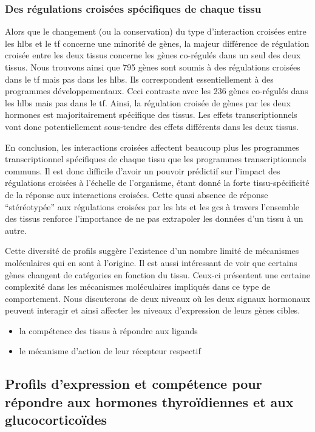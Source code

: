 \documentclass[../main.tex]{subfiles}
\begin{document}
		\subsubsection{Des régulations croisées spécifiques de chaque tissu}
			Alors que le changement (ou la conservation) du type d'interaction croisées entre les \glspl{hlb} et le \gls{tf} concerne une minorité de gènes, la majeur différence de régulation croisée entre les deux tissus concerne les gènes co-régulés dans un seul des deux tissus.
			Nous trouvons ainsi que 795 gènes sont soumis à des régulations croisées dans le \gls{tf} mais pas dans les \glspl{hlb}.
			Ils correspondent essentiellement à des programmes développementaux.
			Ceci contraste avec les 236 gènes co-régulés dans les \glspl{hlb} mais pas dans le \gls{tf}.
			Ainsi, la régulation croisée de gènes par les deux hormones est majoritairement spécifique des tissus.
			Les effets transcriptionnels vont donc potentiellement sous-tendre des effets différents dans les deux tissus.
		\\
		\par
		En conclusion, les interactions croisées affectent beaucoup plus les programmes transcriptionnel spécifiques de chaque tissu que les programmes transcriptionnels communs.
		Il est donc difficile d'avoir un pouvoir prédictif sur l'impact des régulations croisées à l'échelle de l'organisme, étant donné la forte tissu-spécificité de la réponse aux interactions croisées.
		Cette quasi absence de réponse ``stéréotypée'' aux régulations croisées par les \glspl{ht} et les \glspl{gc} à travers l'ensemble des tissus renforce l'importance de ne pas extrapoler les données d'un tissu à un autre.
		\par
		Cette diversité de profils suggère l'existence d'un nombre limité de mécanismes moléculaires qui en sont à l'origine.
		Il est aussi intéressant de voir que certains gènes changent de catégories en fonction du tissu.
		Ceux-ci présentent une certaine complexité dans les mécanismes moléculaires impliqués dans ce type de comportement.
		Nous discuterons de deux niveaux où les deux signaux hormonaux peuvent interagir et ainsi affecter les niveaux d'expression de leurs gènes cibles.
		\begin{itemize}
			\item
				la compétence des tissus à répondre aux ligands
			\item
				le mécanisme d'action de leur récepteur respectif
		\end{itemize}

	\subsection{Profils d'expression et compétence pour répondre aux hormones thyroïdiennes et aux glucocorticoïdes}
\end{document}
